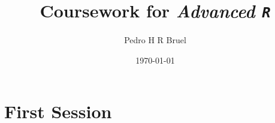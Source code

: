 \documentclass[a4paper]{article}
\author{Pedro H R Bruel}
\date{\today}
\title{Coursework for \emph{Advanced \texttt{R}}}
\begin{document}
\maketitle

\section{First Session}
\label{sec:org7f72e8f}
\end{document}
